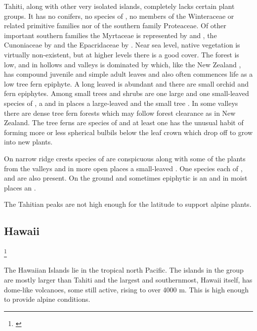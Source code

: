 Tahiti, along with other very isolated islands, completely lacks certain plant groups.
It has no conifers, no species of , no members of the Winteraceae or related primitive families nor of the southern family Proteaceae.
Of other important southern families the Myrtaceae is represented by  and , the Cunoniaceae by  and the Epacridaceae by .
Near sea level, native vegetation is virtually non-existent, but at higher levels there is a good cover.
The forest is low, and in hollows and valleys is dominated by  which, like the New Zealand , has compound juvenile and simple adult leaves and also often commences life as a low tree fern epiphyte.
A long leaved  is abundant and there are small orchid and fern epiphytes.
Among small trees and shrubs are one large and one small-leaved species of , a  and in places a large-leaved  and the small tree .
In some valleys there are dense tree fern forests which may follow forest clearance as in New Zealand.
The tree ferns are species of  and at least one has the unusual habit of forming more or less spherical bulbils below the leaf crown which drop off to grow into new plants.

On narrow ridge crests species of  are conspicuous along with some of the plants from the valleys and in more open places a small-leaved .
One species each of ,  and  are also present.
On the ground and sometimes epiphytic is an  and in moist places an .

The Tahitian peaks are not high enough for the latitude to support alpine plants.

\subsection{Hawai{\okina}i}\footnote{\cite{carlquist1970hawaii}}

The Hawaiian Islands lie in the tropical north Pacific.
The islands in the group are mostly larger than Tahiti and the largest and southernmost, Hawai{\okina}i itself, has dome-like volcanoes, some still active, rising to over 4000 m.
This is high enough to provide alpine conditions.

